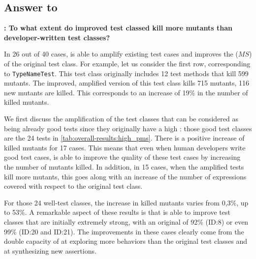 \subsection{Answer to \rqeffectiveness}

\textbf{\rqeffectiveness: To what extent do improved test classed kill more mutants than developer-written test classes?}

In 26 out of 40 cases, \dspot{} is able to amplify existing test cases and improves the \ms ($MS$) of the original test class.
For example, let us consider the first row, corresponding to \texttt{TypeNameTest}. This test class originally includes 12 test methods that kill 599 mutants. The improved, amplified version of this test class kills 715 mutants, \ie{} 116 new mutants are killed. This corresponds to an increase of 19\% in the number of killed mutants.

We first discuss the amplification of the test classes that can be considered as being already good tests since they originally have a high \ms: those good test classes are the 24 tests in \autoref{tab:overall-results:high_pms}.
There is a positive increase of killed mutants for 17 cases. This means that even when human developers write good test cases, \dspot{} is able to improve the quality of these test cases by increasing the number of mutants killed. 
In addition, in 15 cases, when the amplified tests kill more mutants, this goes along with an increase of the number of expressions covered with respect to the original test class.

For those 24 well-test classes, the increase in killed mutants varies from 0,3\%, up to 53\%. A remarkable aspect of these results is that \dspot{} is able to improve test classes that are initially extremely strong, with an original \ms of 92\% (ID:8) or even 99\% (ID:20 and ID:21). The improvements in these cases clearly come from the double capacity of \dspot{} at exploring more behaviors than the original test classes and at synthesizing new assertions.

